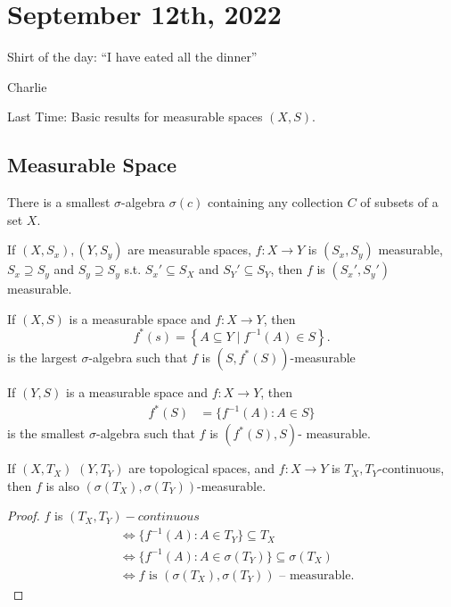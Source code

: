 \section{September 12th, 2022}

\epigraph{Shirt of the day: ``I have eated all the dinner''}{Charlie}

Last Time: Basic results for measurable spaces $(X, S)$.

\subsection{Measurable Space}

\begin{theorem}
  There is a smallest $\sigma$-algebra $\sigma(c)$ containing any collection $C$ of subsets of a set $X$.
\end{theorem}

\begin{lemma}
	If $(X,S_x), (Y,S_y)$ are measurable spaces, $f: X \to Y$ is $(S_x, S_y)$ measurable, $S_x \supseteq S_y$ and $S_y\supseteq S_y$ s.t. $S_x' \subseteq S_X$ and $S_Y' \subseteq S_Y$, then $f$ is $(S_x', S_y')$ measurable.
\end{lemma}

\begin{theorem}
  If $(X, S)$ is a measurable space and $f: X \to Y$, then
	\[
		f^*(s) = \left\{A \subseteq Y \mid f^{-1}(A) \in S \right\}.
	\]
	is the largest $\sigma$-algebra such that $f$ is $(S, f^*(S))$-measurable
\end{theorem}

\begin{theorem}
	If $(Y,S)$ is a measurable space and $f : X \to Y$, then
	 \begin{align*}
		 f^*(S) &= \{f^{-1}(A) : A \in S\}
	\end{align*}
	is the smallest $\sigma$-algebra such that $f$ is $(f^*(S), S)$- measurable.
\end{theorem}

\begin{theorem}
	If $(X, T_X)$ $(Y,T_Y)$ are topological spaces, and  $f : X \to Y$ is $T_X, T_Y$-continuous, then $f$ is also $(\sigma(T_X), \sigma(T_Y))$-measurable.
\end{theorem}

\begin{proof}
	$f$ is $(T_X,T_Y)-continuous$
	\begin{align*}
		&\iff \{f^{-1}(A) : A \in T_Y\} \subseteq T_X \\
		&\iff \{f^{-1}(A) : A \in \sigma(T_Y)\} \subseteq \sigma(T_X) \\
		&\iff f \text{ is } (\sigma(T_X), \sigma(T_Y)) \text{ -- measurable.}
	\end{align*}
\end{proof}

